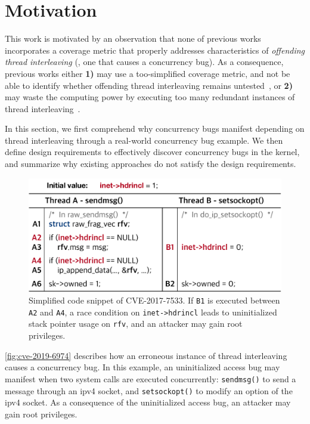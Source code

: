 \section{Motivation}
\label{s:motivation}


This work is motivated by an observation that none of previous works
incorporates a coverage metric that properly addresses characteristics
of \textit{offending thread interleaving} (\ie, one that causes a
concurrency bug).
%
As a consequence, previous works either \textbf{1)} may use a
too-simplified coverage metric, and not be able to identify whether
offending thread interleaving remains untested~\cite{krace}, or
\textbf{2)} may waste the computing power by executing too many
redundant instances of thread interleaving~\cite{snowboard, razzer}.


In this section, we first comprehend why concurrency bugs manifest
depending on thread interleaving through a real-world concurrency bug
example.
%
We then define design requirements to effectively discover concurrency
bugs in the kernel, and summarize why existing approaches do not
satisfy the design requirements.


%
\begin{figure}[t]
  \centering
  \includegraphics[width=0.95\linewidth]{fig/cve-2017-10661.pdf}
  \caption{Simplified code snippet of CVE-2017-7533. If \texttt{B1} is
    executed between \texttt{A2} and \texttt{A4}, a race condition on
    \texttt{inet->hdrincl} leads to uninitialized stack pointer usage
    on \texttt{rfv}, and an attacker may gain root privileges.}
  \label{fig:cve-2019-6974}
\end{figure}
%
\autoref{fig:cve-2019-6974} describes how an erroneous instance of
thread interleaving causes a concurrency bug.
%
In this example, an uninitialized access bug may manifest when two
system calls are executed concurrently: \texttt{sendmsg()} to send a
message through an ipv4 socket, and \texttt{setsockopt()} to modify an
option of the ipv4 socket. As a consequence of the uninitialized
access bug, an attacker may gain root privileges.




